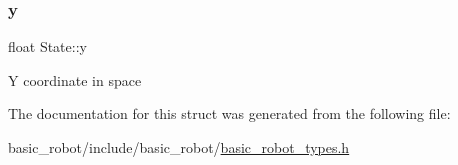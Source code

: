 \subsubsection{\texorpdfstring{y}{y}}
{\footnotesize\ttfamily float State\+::y}

Y coordinate in space 

The documentation for this struct was generated from the following file\+:\begin{DoxyCompactItemize}
\item 
basic\+\_\+robot/include/basic\+\_\+robot/\hyperlink{basic__robot__types_8h}{basic\+\_\+robot\+\_\+types.\+h}\end{DoxyCompactItemize}
